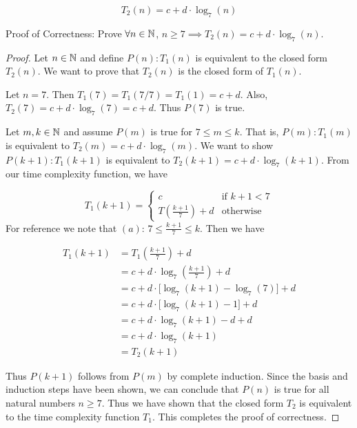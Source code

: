 \documentclass[12pt, a4paper]{amsart}
\theoremstyle{definition}
\theoremstyle{remark}
\numberwithin{Theorem}{section}
\begin{document}
\[
    T_2(n) = c + d \cdot \log_7(n)
\]

\newpage

Proof of Correctness: Prove $\forall n \in \mathbb N$, 
$n \geqslant 7 \implies T_2(n) = c + d \cdot \log_7(n)$.

\begin{proof}
    Let $n \in \mathbb N$ and define $P(n) : T_1(n)$ is equivalent to the 
    closed form $T_2(n)$.
    We want to prove that $T_2(n)$ is the closed form of $T_1(n)$.
    
    \base
    
    Let $n = 7$. Then $T_1(7) = T_1(7/7) = T_1(1) = c + d$. Also,
    $T_2(7) = c + d \cdot \log_7(7) = c + d$. Thus $P(7)$ is true.
    
    \istep
    
    Let $m, k \in \mathbb N$ and assume $P(m)$ is true for $7 \leqslant m \leqslant k$.
    That is, $P(m): T_1(m)$ is equivalent to $T_2(m) = c + d \cdot \log_7(m)$.
    We want to show $P(k + 1): T_1(k + 1)$ is equivalent to 
    $T_2(k + 1) = c + d \cdot \log_7(k + 1)$. From our time complexity
    function, we have
    
    \[ 
    T_1(k + 1) = 
    \begin{cases} 
        c & \text{if $k + 1 < 7$} \\
        T(\frac{k + 1}{7}) + d & \text{otherwise}
   \end{cases}
    \]
    For reference we note that $(a)$: 
    $7 \leqslant \frac{k + 1}{7} \leqslant k$. Then we have
    
    \begin{align*}
        T_1(k + 1) &= T_1(\frac{k + 1}{7}) + d \\
        &= c + d \cdot \log_7(\frac{k+1}{7}) + d \tag{by I.H. and (a)} \\
        &= c + d \cdot \big [ \log_7(k + 1) - \log_7(7) \big ] + d \\
        &= c + d \cdot \big [ \log_7(k + 1) - 1 \big ] + d \\
        &= c + d \cdot \log_7(k+1) - d + d \\
        &= c + d \cdot \log_7(k+1) \\
        &= T_2(k + 1)
    \end{align*}
    
    Thus $P(k + 1)$ follows from $P(m)$ by complete induction.
    Since the basis and induction steps have been shown, we can
    conclude that $P(n)$ is true for all natural numbers  
    $n \geqslant 7$. Thus
    we have shown that the closed form $T_2$ is equivalent to
    the time complexity function $T_1$. This completes the
    proof of correctness.
    
\end{proof}
\end{document}
